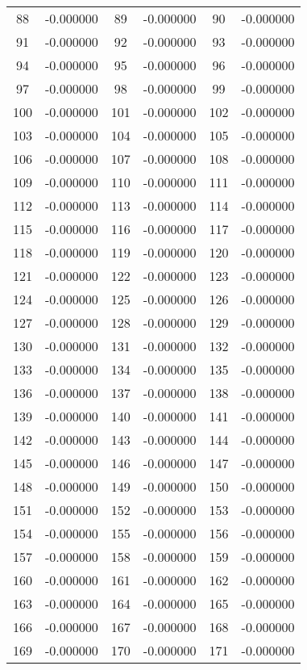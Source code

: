 \documentclass[12pt]{article}
\begin{document}
\begin{longtable}{@{}cc|cc|cc@{}}
88 & -0.000000 & 89 & -0.000000 & 90 & -0.000000 \\
91 & -0.000000 & 92 & -0.000000 & 93 & -0.000000 \\
94 & -0.000000 & 95 & -0.000000 & 96 & -0.000000 \\
97 & -0.000000 & 98 & -0.000000 & 99 & -0.000000 \\
100 & -0.000000 & 101 & -0.000000 & 102 & -0.000000 \\
103 & -0.000000 & 104 & -0.000000 & 105 & -0.000000 \\
106 & -0.000000 & 107 & -0.000000 & 108 & -0.000000 \\
109 & -0.000000 & 110 & -0.000000 & 111 & -0.000000 \\
112 & -0.000000 & 113 & -0.000000 & 114 & -0.000000 \\
115 & -0.000000 & 116 & -0.000000 & 117 & -0.000000 \\
118 & -0.000000 & 119 & -0.000000 & 120 & -0.000000 \\
121 & -0.000000 & 122 & -0.000000 & 123 & -0.000000 \\
124 & -0.000000 & 125 & -0.000000 & 126 & -0.000000 \\
127 & -0.000000 & 128 & -0.000000 & 129 & -0.000000 \\
130 & -0.000000 & 131 & -0.000000 & 132 & -0.000000 \\
133 & -0.000000 & 134 & -0.000000 & 135 & -0.000000 \\
136 & -0.000000 & 137 & -0.000000 & 138 & -0.000000 \\
139 & -0.000000 & 140 & -0.000000 & 141 & -0.000000 \\
142 & -0.000000 & 143 & -0.000000 & 144 & -0.000000 \\
145 & -0.000000 & 146 & -0.000000 & 147 & -0.000000 \\
148 & -0.000000 & 149 & -0.000000 & 150 & -0.000000 \\
151 & -0.000000 & 152 & -0.000000 & 153 & -0.000000 \\
154 & -0.000000 & 155 & -0.000000 & 156 & -0.000000 \\
157 & -0.000000 & 158 & -0.000000 & 159 & -0.000000 \\
160 & -0.000000 & 161 & -0.000000 & 162 & -0.000000 \\
163 & -0.000000 & 164 & -0.000000 & 165 & -0.000000 \\
166 & -0.000000 & 167 & -0.000000 & 168 & -0.000000 \\
169 & -0.000000 & 170 & -0.000000 & 171 & -0.000000 \\

\end{longtable}
\end{document}
